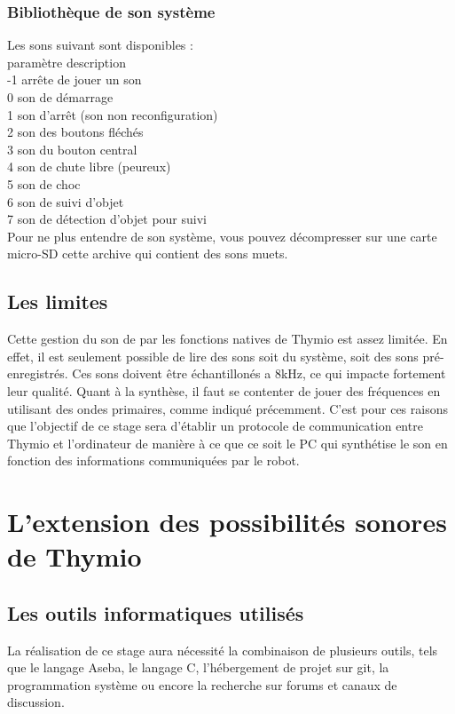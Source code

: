 \documentclass[a4paper, 12pt]{report}
\begin{document}
\subsection{Bibliothèque de son système}
Les sons suivant sont disponibles :\\
paramètre 	description\\
-1 	arrête de jouer un son\\
0 	son de démarrage\\
1 	son d'arrêt (son non reconfiguration)\\
2 	son des boutons fléchés\\
3 	son du bouton central\\
4 	son de chute libre (peureux)\\
5 	son de choc\\
6 	son de suivi d'objet\\
7 	son de détection d'objet pour suivi\\
Pour ne plus entendre de son système, vous pouvez décompresser sur une carte micro-SD cette archive qui contient des sons muets.

\section{Les limites}
Cette gestion du son de par les fonctions natives de Thymio est assez limitée. En effet, il est seulement possible de lire des sons soit du système, soit des sons pré-enregistrés. Ces sons doivent être échantillonés a 8kHz, ce qui impacte fortement leur qualité. Quant à la synthèse, il faut se contenter de jouer des fréquences en utilisant des ondes primaires, comme indiqué précemment. C'est pour ces raisons que l'objectif de ce stage sera d'établir un protocole de communication entre Thymio et l'ordinateur de manière à ce que ce soit le PC qui synthétise le son en fonction des informations communiquées par le robot.

\chapter{L'extension des possibilités sonores de Thymio}
\section{Les outils informatiques utilisés}
La réalisation de ce stage aura nécessité la combinaison de plusieurs outils, tels que le langage Aseba, le langage C, l'hébergement de projet sur git, la programmation système ou encore la recherche sur forums et canaux de discussion.
\end{document}
